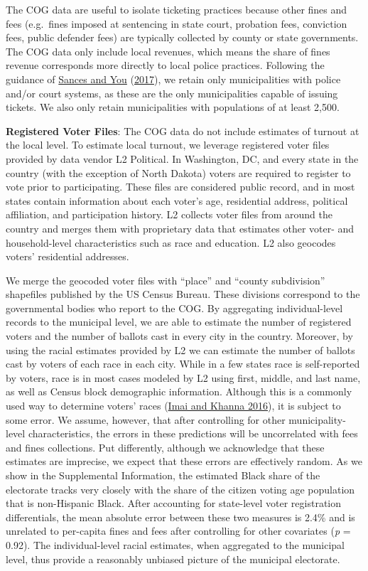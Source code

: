 \documentclass[
  12pt,
]{article}
\begin{document}
The COG data are useful to isolate ticketing practices because other fines and fees (e.g.~fines imposed at sentencing in state court, probation fees, conviction fees, public defender fees) are typically collected by county or state governments. The COG data only include local revenues, which means the share of fines revenue corresponds more directly to local police practices. Following the guidance of \protect\hyperlink{ref-Sances2017}{Sances and You} (\protect\hyperlink{ref-Sances2017}{2017}), we retain only municipalities with police and/or court systems, as these are the only municipalities capable of issuing tickets. We also only retain municipalities with populations of at least 2,500.

\textbf{Registered Voter Files}: The COG data do not include estimates of turnout at the local level. To estimate local turnout, we leverage registered voter files provided by data vendor L2 Political. In Washington, DC, and every state in the country (with the exception of North Dakota) voters are required to register to vote prior to participating. These files are considered public record, and in most states contain information about each voter's age, residential address, political affiliation, and participation history. L2 collects voter files from around the country and merges them with proprietary data that estimates other voter- and household-level characteristics such as race and education. L2 also geocodes voters' residential addresses.

We merge the geocoded voter files with ``place'' and ``county subdivision'' shapefiles published by the US Census Bureau. These divisions correspond to the governmental bodies who report to the COG. By aggregating individual-level records to the municipal level, we are able to estimate the number of registered voters and the number of ballots cast in every city in the country. Moreover, by using the racial estimates provided by L2 we can estimate the number of ballots cast by voters of each race in each city. While in a few states race is self-reported by voters, race is in most cases modeled by L2 using first, middle, and last name, as well as Census block demographic information. Although this is a commonly used way to determine voters' races (\protect\hyperlink{ref-Imai2016}{Imai and Khanna 2016}), it is subject to some error. We assume, however, that after controlling for other municipality-level characteristics, the errors in these predictions will be uncorrelated with fees and fines collections. Put differently, although we acknowledge that these estimates are imprecise, we expect that these errors are effectively random. As we show in the Supplemental Information, the estimated Black share of the electorate tracks very closely with the share of the citizen voting age population that is non-Hispanic Black. After accounting for state-level voter registration differentials, the mean absolute error between these two measures is 2.4\% and is unrelated to per-capita fines and fees after controlling for other covariates (\emph{p} = 0.92). The individual-level racial estimates, when aggregated to the municipal level, thus provide a reasonably unbiased picture of the municipal electorate.
\end{document}
